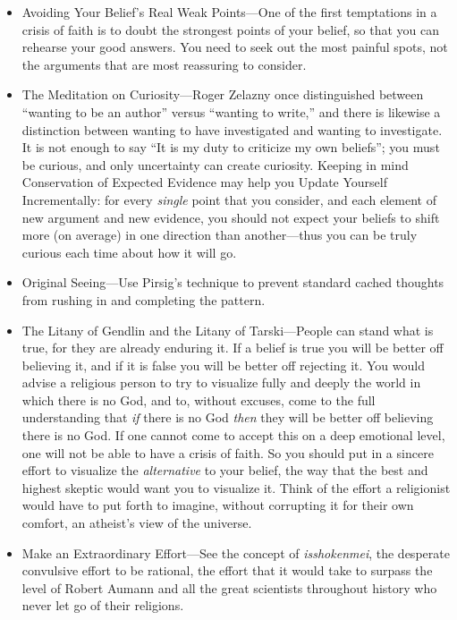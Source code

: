 \begin{itemize}
\item {
 Avoiding Your Belief's Real Weak Points---One of
the first temptations in a crisis of faith is to doubt the strongest
points of your belief, so that you can rehearse your good answers. You
need to seek out the most painful spots, not the arguments that are
most reassuring to consider.}

\item {
 The Meditation on Curiosity---Roger Zelazny once distinguished
between ``wanting to be an author''
versus ``wanting to write,'' and
there is likewise a distinction between wanting to have investigated
and wanting to investigate. It is not enough to say
``It is my duty to criticize my own
beliefs''; you must be curious, and only uncertainty
can create curiosity. Keeping in mind Conservation of Expected Evidence
may help you Update Yourself Incrementally: for every \textit{single}
point that you consider, and each element of new argument and new
evidence, you should not expect your beliefs to shift more (on average)
in one direction than another---thus you can be truly curious each time
about how it will go.}

\item {
 Original Seeing---Use Pirsig's technique to
prevent standard cached thoughts from rushing in and completing the
pattern.}

\item {
 The Litany of Gendlin and the Litany of Tarski---People can stand
what is true, for they are already enduring it. If a belief is true you
will be better off believing it, and if it is false you will be better
off rejecting it. You would advise a religious person to try to
visualize fully and deeply the world in which there is no God, and to,
without excuses, come to the full understanding that \textit{if} there
is no God \textit{then} they will be better off believing there is no
God. If one cannot come to accept this on a deep emotional level, one
will not be able to have a crisis of faith. So you should put in a
sincere effort to visualize the \textit{alternative} to your belief,
the way that the best and highest skeptic would want you to visualize
it. Think of the effort a religionist would have to put forth to
imagine, without corrupting it for their own comfort, an
atheist's view of the universe.}

\item {
 Make an Extraordinary Effort---See the concept of
\textit{isshokenmei}, the desperate convulsive effort to be rational,
the effort that it would take to surpass the level of Robert Aumann and
all the great scientists throughout history who never let go of their
religions.}


\end{itemize}
